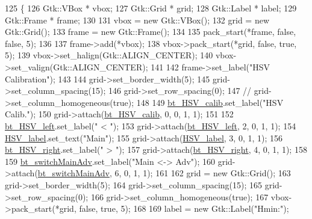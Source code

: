 \begin{DoxyCode}
125                                  \{
126     Gtk::VBox * vbox;
127     Gtk::Grid * grid;
128     Gtk::Label * label;
129     Gtk::Frame * frame;
130 
131     vbox = \textcolor{keyword}{new} Gtk::VBox();
132     grid = \textcolor{keyword}{new} Gtk::Grid();
133     frame = \textcolor{keyword}{new} Gtk::Frame();
134 
135     pack\_start(*frame, \textcolor{keyword}{false}, \textcolor{keyword}{false}, 5);
136 
137     frame->add(*vbox);
138     vbox->pack\_start(*grid, \textcolor{keyword}{false}, \textcolor{keyword}{true}, 5);
139     vbox->set\_halign(Gtk::ALIGN\_CENTER);
140     vbox->set\_valign(Gtk::ALIGN\_CENTER);
141 
142     frame->set\_label(\textcolor{stringliteral}{"HSV Calibration"});
143 
144     grid->set\_border\_width(5);
145     grid->set\_column\_spacing(15);
146     grid->set\_row\_spacing(0);
147     \textcolor{comment}{// grid->set\_column\_homogeneous(true);}
148 
149     \hyperlink{class_vision_g_u_i_a9506af83c1ee97d1b4f32b3fbb53fc48}{bt\_HSV\_calib}.set\_label(\textcolor{stringliteral}{"HSV Calib."});
150     grid->attach(\hyperlink{class_vision_g_u_i_a9506af83c1ee97d1b4f32b3fbb53fc48}{bt\_HSV\_calib}, 0, 0, 1, 1);
151 
152     \hyperlink{class_vision_g_u_i_a98323988d4a353190a02c827de0cecbf}{bt\_HSV\_left}.set\_label(\textcolor{stringliteral}{" < "});
153     grid->attach(\hyperlink{class_vision_g_u_i_a98323988d4a353190a02c827de0cecbf}{bt\_HSV\_left}, 2, 0, 1, 1);
154     \hyperlink{class_vision_g_u_i_a87c626e284e122d0e95e66277a484dd3}{HSV\_label}.set\_text(\textcolor{stringliteral}{"Main"});
155     grid->attach(\hyperlink{class_vision_g_u_i_a87c626e284e122d0e95e66277a484dd3}{HSV\_label}, 3, 0, 1, 1);
156     \hyperlink{class_vision_g_u_i_a3b19593890776c5c77e1a39ac3af627d}{bt\_HSV\_right}.set\_label(\textcolor{stringliteral}{" > "});
157     grid->attach(\hyperlink{class_vision_g_u_i_a3b19593890776c5c77e1a39ac3af627d}{bt\_HSV\_right}, 4, 0, 1, 1);
158 
159     \hyperlink{class_vision_g_u_i_a62b2427b20780649d71611c6cdb6a10a}{bt\_switchMainAdv}.set\_label(\textcolor{stringliteral}{"Main <-> Adv"});
160     grid->attach(\hyperlink{class_vision_g_u_i_a62b2427b20780649d71611c6cdb6a10a}{bt\_switchMainAdv}, 6, 0, 1, 1);
161 
162     grid = \textcolor{keyword}{new} Gtk::Grid();
163     grid->set\_border\_width(5);
164     grid->set\_column\_spacing(15);
165     grid->set\_row\_spacing(0);
166     grid->set\_column\_homogeneous(\textcolor{keyword}{true});
167     vbox->pack\_start(*grid, \textcolor{keyword}{false}, \textcolor{keyword}{true}, 5);
168 
169     label = \textcolor{keyword}{new} Gtk::Label(\textcolor{stringliteral}{"Hmin:"});

\end{DoxyCode}
